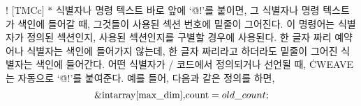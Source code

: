 \@! [TMCc] $*$
식별자나 명령 텍스트 바로 앞에 `\.{@!}'를 붙이면, 그 식별자나 명령
텍스트가 색인에 들어갈 때, 그것들이 사용된 섹션 번호에 밑줄이 그어진다.
이 명령어는 식별자가 정의된 섹션인지, 사용된 섹션인지를 구별할 경우에
사용된다. 한 글자 짜리 예약어나 식별자는 색인에 들어가지 않는데, 한 글자
짜리라고 하더라도 밑줄이 그어진 식별자는 색인에 들어간다.
어떤 식별자가 \CEE/ 코드에서 정의되거나 선언될 때, \.{CWEAVE}는
자동으로 `\.{@!}'를 붙여준다. 예를 들어, 다음과 같은 정의를 하면,
$$\hbox{\&{int} \\{array}[\\{max\_dim}],
\\{count}${}=\\{old\_count};$}$$
